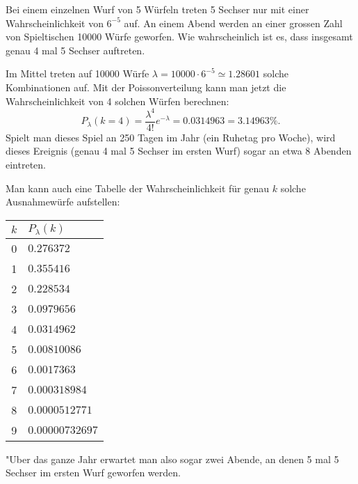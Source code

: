 Bei einem einzelnen Wurf von 5 Würfeln treten 5 Sechser nur mit
einer Wahrscheinlichkeit von $6^{-5}$ auf. An einem Abend werden
an einer grossen Zahl von Spieltischen 10000 Würfe geworfen.
Wie wahrscheinlich ist es, dass insgesamt genau 4 mal 5 Sechser
auftreten.


\begin{loesung}
Im Mittel treten auf 10000 Würfe $\lambda=10000\cdot 6^{-5}\simeq 1.28601$
solche
Kombinationen auf. Mit der Poissonverteilung kann man jetzt die
Wahrscheinlichkeit von 4 solchen Würfen berechnen:
\[
P_\lambda(k=4)=\frac{\lambda^4}{4!}e^{-\lambda}
=
0.0314963=3.14963\%.
\]
Spielt man dieses Spiel an 250 Tagen im Jahr (ein Ruhetag pro Woche),
wird dieses Ereignis (genau 4 mal 5 Sechser im ersten Wurf) sogar
an etwa 8 Abenden eintreten.

Man kann auch eine Tabelle
der Wahrscheinlichkeit für genau $k$ solche Ausnahmewürfe aufstellen:
\begin{center}
\begin{tabular}{|c|l|}
\hline
$k$&$P_\lambda(k)$\\
\hline
0&$0.276372$\\
1&$0.355416$\\
2&$0.228534$\\
3&$0.0979656$\\
4&$0.0314962$\\
5&$0.00810086$\\
6&$0.0017363$\\
7&$0.000318984$\\
8&$0.0000512771$\\
9&$0.00000732697$\\
\hline
\end{tabular}
\end{center}
"Uber das ganze Jahr erwartet man also sogar zwei Abende,
an denen 5 mal 5 Sechser im ersten Wurf geworfen werden.
\end{loesung}


